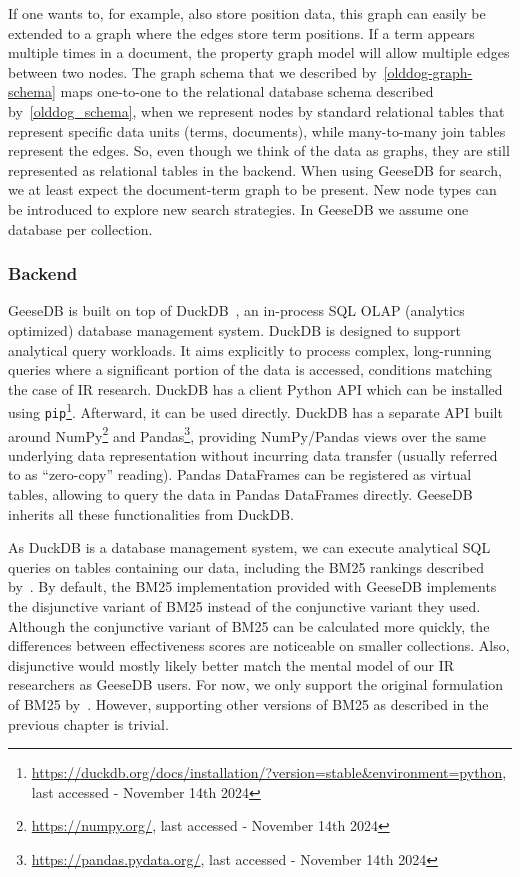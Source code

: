If one wants to, for example, also store position data, this graph can easily be extended to a graph where the edges store term positions. If a term appears multiple times in a document, the property graph model will allow multiple edges between two nodes. The graph schema that we described by~\cref{olddog-graph-schema} maps one-to-one to the relational database schema described by~\cref{olddog_schema}, when we represent nodes by standard relational tables that represent specific data units (terms, documents), while many-to-many join tables represent the edges. So, even though we think of the data as graphs, they are still represented as relational tables in the backend. When using GeeseDB for search, we at least expect the document-term graph to be present. New node types can be introduced to explore new search strategies. In GeeseDB we assume one database per collection. 

\subsubsection{Backend}
GeeseDB is built on top of DuckDB~\citep{duckdb}, an in-process SQL OLAP (analytics optimized) database management system. DuckDB is designed to support analytical query workloads. It aims explicitly to process complex, long-running queries where a significant portion of the data is accessed, conditions matching the case of IR research. DuckDB has a client Python API which can be installed using \texttt{pip}\footnote{\url{https://duckdb.org/docs/installation/?version=stable&environment=python}, last accessed - November 14th 2024}. Afterward, it can be used directly. DuckDB has a separate API built around NumPy\footnote{\url{https://numpy.org/}, last accessed - November 14th 2024} and Pandas\footnote{\url{https://pandas.pydata.org/}, last accessed - November 14th 2024}, providing NumPy/Pandas views over the same underlying data representation without incurring data transfer (usually referred to as ``zero-copy'' reading). Pandas DataFrames can be registered as virtual tables, allowing to query the data in Pandas DataFrames directly. GeeseDB inherits all these functionalities from DuckDB. 

As DuckDB is a database management system, we can execute analytical SQL queries on tables containing our data, including the BM25 rankings described by~\citet{OldDog}. By default, the BM25 implementation provided with GeeseDB implements the disjunctive variant of BM25 instead of the conjunctive variant they used. Although the conjunctive variant of BM25 can be calculated more quickly, the differences between effectiveness scores are noticeable on smaller collections. Also, disjunctive would mostly likely better match the mental model of our IR researchers as GeeseDB users. For now, we only support the original formulation of BM25 by~\citet{bm25-robertson}. However, supporting other versions of BM25 as described in the previous chapter is trivial.

